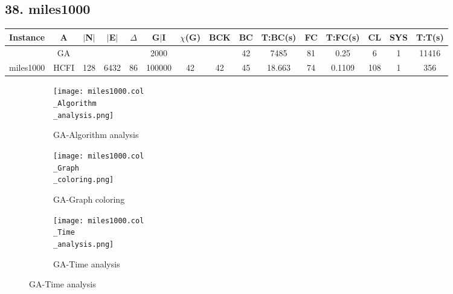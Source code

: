 \documentclass[10pt]{article}
\begin{document}
\subsection*{\hspace{0,9073976cm} 38. miles1000 }
\begin{table}[H]
\centering
\begin{tabular}{|c|c|c|c|c|c|c|c|c|c|c|c|c|c|c|}
\hline
Instance& A &$|$N$|$ & $|$E$|$ & $\Delta$ & G$|$I & $\chi$(G) &BCK&BC & T:BC(s) & FC & T:FC(s) & CL & SYS & T:T(s) \\ \hline \hline

	&GA&       &                   &                     &   2000      &     \cellcolor{yellow} & {\cellcolor{yellow}}& {{\cellcolor{green}42}}
&7485  &81        &0.25                   &6                    & 1         &11416        \\ \cline{2-2} \cline{6-6} \cline{9-15}
 \multirow{-2}{*}{miles1000} &HCFI   &\multirow{-2}{*}{128}   &\multirow{-2}{*}{6432}     &\multirow{-2}{*}{86}     &100000     &\multirow{-2}{*}{\cellcolor{yellow}42}      & \multirow{-2}{*}{\cellcolor{yellow}42}    &{\cellcolor{green}45}     &18.663         &74    &0.1109         &108    &1     &356        \\ \hline 
\end{tabular}
\end{table}
\graphicspath{{./Core1/Solutions/GA/miles1000.col}}
\begin{figure}[H]
\begin{subfigure}{.33\textwidth}
  \centering
  \texttt{[image: miles1000.col\\\_Algorithm\\\_analysis.png]}
  \caption{GA-Algorithm analysis}
   \label{fig:subfig1}
\end{subfigure}%
\begin{subfigure}{.33\textwidth}
  \centering
  \texttt{[image: miles1000.col\\\_Graph\\\_coloring.png]}
  \caption{GA-Graph coloring}
  \label{fig:subfig2}
\end{subfigure}
\begin{subfigure}{.33\textwidth}
  \centering
  \texttt{[image: miles1000.col\\\_Time\\\_analysis.png]}
  \caption{GA-Time analysis}
  \end{subfigure}
\end{figure}
\end{document}
